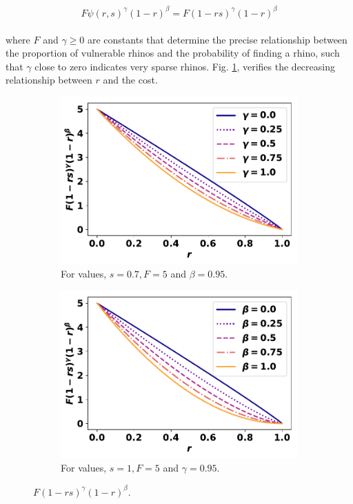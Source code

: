 \documentclass[10pt]{article}
\begin{document}
\begin{eqnarray}
	\label{eqn:individual_cost}
	\begin{array}{l}
	F \psi(r, s)^{\gamma} (1 - r)^{\beta} = F (1 - rs) ^{\gamma} (1 - r) ^{\beta}
	\end{array}
\end{eqnarray}

where \(F\) and \(\gamma \geq 0\) are constants that determine the precise relationship
between the proportion of vulnerable rhinos and the probability of finding a rhino,
such that \(\gamma\) close to zero indicates very sparse rhinos. Fig.
\ref{fig:CostCurves},  verifies the decreasing relationship between \(r\) and the
cost.

\begin{figure}[!htbp]
\begin{center}
    \begin{subfigure}{0.40\textwidth}
        \includegraphics[width=\linewidth]{images/gammas_curve.pdf}
        \caption{For values, \(s=0.7, F=5\) and \(\beta=0.95\).}
    \end{subfigure}
    \begin{subfigure}{0.40\textwidth}
        \includegraphics[width=\linewidth]{images/betas_curve.pdf}
        \caption{For values, \(s=1, F=5\) and \(\gamma=0.95\).}
    \end{subfigure}
\caption{\(F (1 - rs)^{\gamma} (1 - r)^{\beta}\).}\label{fig:CostCurves}
\end{center}
\end{figure}
\end{document}
